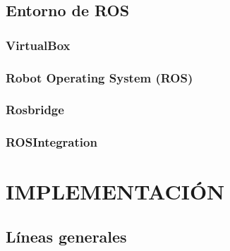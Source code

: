 \documentclass[a4paper, 12pt, spanish, twoside]{article}
\begin{document}
\subsection{Entorno de ROS} \label{sec:herramientas:entornoros}

\subsubsection{VirtualBox} \label{sec:herramientas:entornoros:virtualbox}


\subsubsection{Robot Operating System (ROS)} \label{sec:herramientas:entornoros:ros}


\subsubsection{Rosbridge} \label{sec:herramientas:entornoros:rosbridge}


\subsubsection{ROSIntegration} \label{sec:herramientas:entornoros:rosintegration}


\clearpage





\newpage
\section{IMPLEMENTACIÓN} \label{sec:implementacion}

\subsection{Líneas generales} 
\end{document}

